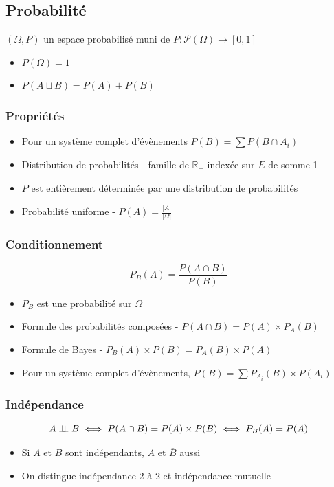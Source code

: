 \documentclass[openany]{book}
\begin{document}
\subsection{Probabilité}
$(\Omega, P)$ un espace probabilisé muni de $P: \mathcal{P}(\Omega) \rightarrow [0, 1]$

\begin{itemize}
    \item $P(\Omega) = 1$
    \item $P(A \sqcup B) = P(A) + P(B)$
\end{itemize}

\subsubsection{Propriétés}
\begin{itemize}
    \item Pour un système complet d'évènements $P(B) = \sum P(B\cap A_i)$
    \item Distribution de probabilités - famille de $\mathbb{R}_+$ indexée sur $E$ de somme 1
    \item $P$ est entièrement déterminée par une distribution de probabilités
    \item Probabilité uniforme - $P(A) = \frac{|A|}{|\Omega|}$
\end{itemize}

\subsubsection{Conditionnement}
\[ P_B(A) = \frac{P(A \cap B)}{P(B)} \]

\begin{itemize}
    \item $P_B$ est une probabilité sur $\Omega$
    \item Formule des probabilités composées - $P(A \cap B) = P(A) \times P_A(B)$
    \item Formule de Bayes - $P_B(A) \times P(B) = P_A(B) \times P(A)$
    \item Pour un système complet d'évènements, $P(B) = \sum P_{A_i}(B) \times P(A_i)$
\end{itemize}

\subsubsection{Indépendance}
\[ A \perp\!\!\!\perp B \iff P(A \cap B) = P(A) \times P(B) \iff P_B(A) = P(A) \]

\begin{itemize}
    \item Si $A$ et $B$ sont indépendants, $A$ et $\overline{B}$ aussi
    \item On distingue indépendance 2 à 2 et indépendance mutuelle
\end{itemize}
\end{document}
